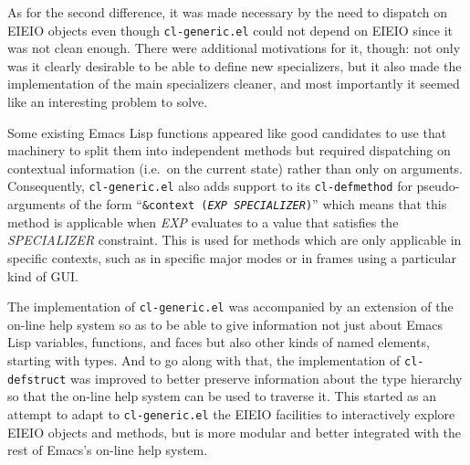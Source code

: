 \documentclass[format=acmsmall, review]{acmart}
\newcommand \Elisp {Emacs Lisp}
\newcommand \id[1] {\textrm{\textsl{#1}}}
\begin{document}
As for the second difference, it was made necessary by the need to dispatch
on EIEIO objects even though \texttt{cl-generic.el} could not depend on
EIEIO since it was not clean enough.  There were additional motivations for
it, though: not only was it clearly desirable to be able to define new
specializers, but it also made the implementation of the main specializers
cleaner, and most importantly it seemed like an interesting problem
to solve.


Some existing \Elisp{} functions appeared like good candidates to use that
machinery to split them into independent methods but required dispatching
on contextual information (i.e.\ on the current state) rather than only on
arguments.  Consequently, \texttt{cl-generic.el} also adds support to its
\texttt{cl-defmethod} for pseudo-arguments of the form ``\texttt{\&context
  (\id{EXP} \id{SPECIALIZER})}'' which means that this method is
applicable when \id{EXP} evaluates to a value that satisfies the
\id{SPECIALIZER} constraint.  This is used for methods which
are only applicable in specific contexts, such as in specific major modes or
in frames using a particular kind of GUI.

The implementation of \texttt{cl-generic.el} was accompanied by an extension
of the on-line help system so as to be able to give information not just
about \Elisp{} variables, functions, and faces but also other kinds of named
elements, starting with types.  And to go along with that, the implementation
of \texttt{cl-defstruct} was improved to better preserve information about
the type hierarchy so that the on-line help system can be used to traverse
it.  This started as an attempt to adapt to \texttt{cl-generic.el} the EIEIO
facilities to interactively explore EIEIO objects and methods, but is more
modular and better integrated with the rest of Emacs's on-line help system.
\end{document}
